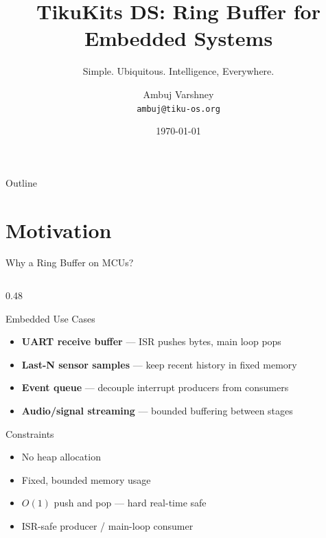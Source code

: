 \documentclass[aspectratio=169, 10pt]{beamer}
\title[TikuKits DS]{TikuKits DS: Ring Buffer for Embedded Systems}
\subtitle{Simple. Ubiquitous. Intelligence, Everywhere.}
\author[Ambuj Varshney]{Ambuj Varshney \\ \texttt{ambuj@tiku-os.org}}
\date{\today}
\begin{document}
\begin{frame}
\titlepage
\end{frame}

\begin{frame}{Outline}
\tableofcontents
\end{frame}

\section{Motivation}

\begin{frame}{Why a Ring Buffer on MCUs?}
\begin{columns}[T]
\begin{column}{0.48\textwidth}
\begin{block}{Embedded Use Cases}
\begin{itemize}
  \item \textbf{UART receive buffer} --- ISR pushes bytes, main loop pops
  \item \textbf{Last-N sensor samples} --- keep recent history in fixed memory
  \item \textbf{Event queue} --- decouple interrupt producers from consumers
  \item \textbf{Audio/signal streaming} --- bounded buffering between stages
\end{itemize}
\end{block}

\begin{block}{Constraints}
\begin{itemize}
  \item No heap allocation
  \item Fixed, bounded memory usage
  \item $O(1)$ push and pop --- hard real-time safe
  \item ISR-safe producer / main-loop consumer
\end{itemize}
\end{block}
\end{column}


\end{columns}
\end{frame}
\end{document}
